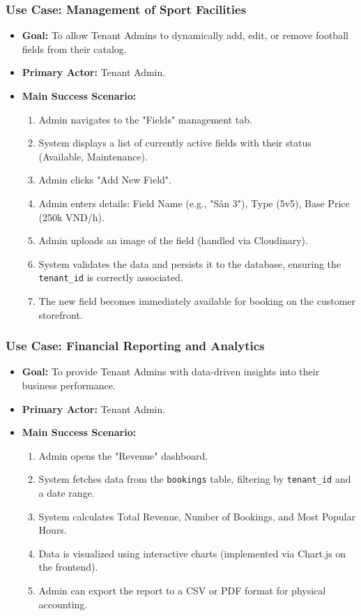 \subsubsection{Use Case: Management of Sport Facilities}
\begin{itemize}
    \item \textbf{Goal:} To allow Tenant Admins to dynamically add, edit, or remove football fields from their catalog.
    \item \textbf{Primary Actor:} Tenant Admin.
    \item \textbf{Main Success Scenario:}
    \begin{enumerate}
        \item Admin navigates to the "Fields" management tab.
        \item System displays a list of currently active fields with their status (Available, Maintenance).
        \item Admin clicks "Add New Field".
        \item Admin enters details: Field Name (e.g., "Sân 3"), Type (5v5), Base Price (250k VND/h).
        \item Admin uploads an image of the field (handled via Cloudinary).
        \item System validates the data and persists it to the database, ensuring the \texttt{tenant\_id} is correctly associated.
        \item The new field becomes immediately available for booking on the customer storefront.
    \end{enumerate}
\end{itemize}

\subsubsection{Use Case: Financial Reporting and Analytics}
\begin{itemize}
    \item \textbf{Goal:} To provide Tenant Admins with data-driven insights into their business performance.
    \item \textbf{Primary Actor:} Tenant Admin.
    \item \textbf{Main Success Scenario:}
    \begin{enumerate}
        \item Admin opens the "Revenue" dashboard.
        \item System fetches data from the \texttt{bookings} table, filtering by \texttt{tenant\_id} and a date range.
        \item System calculates Total Revenue, Number of Bookings, and Most Popular Hours.
        \item Data is visualized using interactive charts (implemented via Chart.js on the frontend).
        \item Admin can export the report to a CSV or PDF format for physical accounting.
    \end{enumerate}
\end{itemize}

